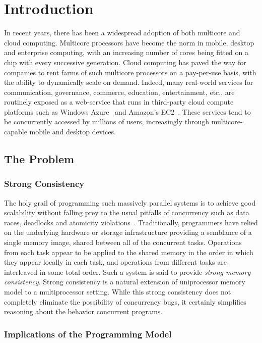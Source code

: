 \chapter{Introduction}

In recent years, there has been a widespread adoption of both multicore and
cloud computing. Multicore processors have become the norm in mobile, desktop
and enterprise computing, with an increasing number of cores being fitted on a
chip with every successive generation. Cloud computing has paved the way for
companies to rent farms of such multicore processors on a pay-per-use basis,
with the ability to dynamically scale on demand. Indeed, many real-world
services for communication, governance, commerce, education, entertainment,
etc., are routinely exposed as a web-service that runs in third-party cloud
compute platforms such as Windows Azure~\cite{Calder2011} and Amazon’s
EC2~\cite{EC2}. These services tend to be concurrently accessed by millions of
users, increasingly through multicore-capable mobile and desktop devices.

\section{The Problem}

\subsection{Strong Consistency}

The holy grail of programming such massively parallel systems is to achieve
good scalability without falling prey to the usual pitfalls of concurrency such
as data races, deadlocks and atomicity violations~\cite{Lu2008}. Traditionally,
programmers have relied on the underlying hardware or storage infrastructure
providing a semblance of a single memory image, shared between all of the
concurrent tasks. Operations from each task appear to be applied to the shared
memory in the order in which they appear locally in each task, and operations
from different tasks are interleaved in some total order. Such a system is said
to provide \emph{strong memory consistency}. Strong consistency is a natural
extension of uniprocessor memory model to a multiprocessor setting. While this
strong consistency does not completely eliminate the possibility of concurrency
bugs, it certainly simplifies reasoning about the behavior concurrent programs.

\subsection{Implications of the Programming Model}

